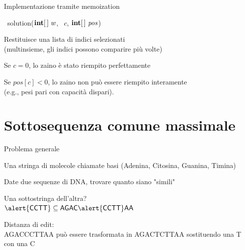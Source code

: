 \begin{frame}{Implementazione tramite memoization}

\vspace{-9pt}
\begin{Procedure}
\caption[A]{\List\ \textsf{solution}($\INTEGER[\,]\ w$, \INTEGER\ $c$, 
\alert{$\INTEGER[\,]\ \mathit{\mathit{pos}}$})}
\end{Procedure}

\BIL
\item Restituisce una \alert{lista} di indici selezionati\\ 
(\alert{multinsieme}, gli indici possono
comparire più volte)
\item Se $c=0$, lo zaino è stato riempito perfettamente
\item Se $pos[c] < 0$, lo zaino non può essere riempito interamente\\
(e.g., pesi pari con capacità dispari).
\EIL

\end{frame}



\section{Sottosequenza comune massimale}

\begin{frame}{Problema generale}

\vspace{-9pt}
\begin{myboxtitle}[DNA]
Una stringa di molecole chiamate basi (\alert{A}denina, \alert{C}itosina, \alert{G}uanina, \alert{T}imina)
\end{myboxtitle}


\begin{myboxtitle}[Problema]
Date due sequenze di DNA, trovare quanto siano "simili"
\end{myboxtitle}

\begin{myboxtitle}[Esempi]
\BIL
\item Una \alert{sottostringa} dell'altra?\\
$\alert{\textsf{CCTT}} \subseteq \textsf{AGAC\alert{CCTT}AA}$
\item \alert{Distanza di edit}:\\
\textsf{AGAC\alert{C}CTTAA} può essere trasformata in \textsf{AGAC\alert{T}CTTAA} sostituendo
una \textsf{T} con una \textsf{C}
\EIL
\end{myboxtitle}

\end{frame}


